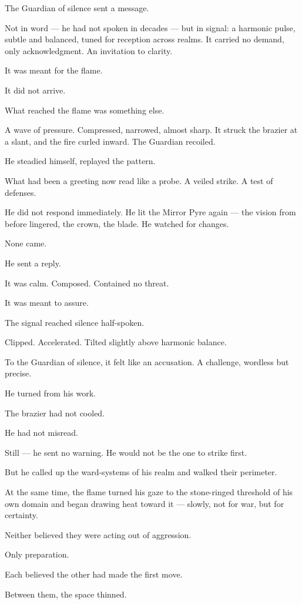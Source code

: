 \documentclass[12pt]{article}
\begin{document}
The Guardian of silence sent a message.

Not in word — he had not spoken in decades — but in signal: a harmonic pulse, subtle and balanced, tuned for reception across realms. It carried no demand, only acknowledgment. An invitation to clarity.

It was meant for the flame.

It did not arrive.

What reached the flame was something else.

A wave of pressure. Compressed, narrowed, almost sharp. It struck the brazier at a slant, and the fire curled inward. The Guardian recoiled.

He steadied himself, replayed the pattern.

What had been a greeting now read like a probe. A veiled strike. A test of defenses.

He did not respond immediately. He lit the Mirror Pyre again — the vision from before lingered, the crown, the blade. He watched for changes.

None came.

He sent a reply.

It was calm. Composed. Contained no threat.

It was meant to assure.

The signal reached silence half-spoken.

Clipped. Accelerated. Tilted slightly above harmonic balance.

To the Guardian of silence, it felt like an accusation. A challenge, wordless but precise.

He turned from his work.

The brazier had not cooled.

He had not misread.

Still — he sent no warning. He would not be the one to strike first.

But he called up the ward-systems of his realm and walked their perimeter.

At the same time, the flame turned his gaze to the stone-ringed threshold of his own domain and began drawing heat toward it — slowly, not for war, but for certainty.

Neither believed they were acting out of aggression.

Only preparation.

Each believed the other had made the first move.

Between them, the space thinned.
\end{document}
